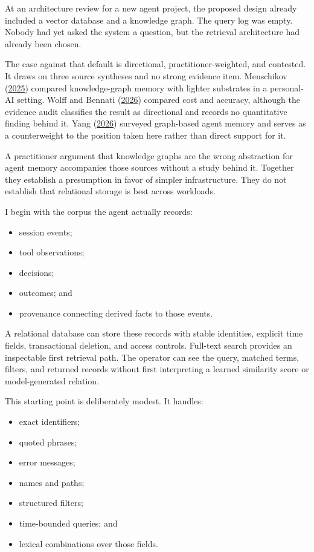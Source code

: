 At an architecture review for a new agent project, the proposed design already included a vector database and a knowledge graph. The query log was empty. Nobody had yet asked the system a question, but the retrieval architecture had already been chosen.

The case against that default is directional, practitioner-weighted, and contested. It draws on three source syntheses and no strong evidence item. Menschikov (\href{https://arxiv.org/abs/2506.17001}{2025}) compared knowledge-graph memory with lighter substrates in a personal-AI setting. Wolff and Bennati (\href{https://arxiv.org/abs/2601.07978}{2026}) compared cost and accuracy, although the evidence audit classifies the result as directional and records no quantitative finding behind it. Yang (\href{https://arxiv.org/abs/2602.05665}{2026}) surveyed graph-based agent memory and serves as a counterweight to the position taken here rather than direct support for it.

A practitioner argument that knowledge graphs are the wrong abstraction for agent memory accompanies those sources without a study behind it. Together they establish a presumption in favor of simpler infrastructure. They do not establish that relational storage is best across workloads.


I begin with the corpus the agent actually records:

\begin{itemize}
\tightlist
\item
  session events;
\item
  tool observations;
\item
  decisions;
\item
  outcomes; and
\item
  provenance connecting derived facts to those events.
\end{itemize}

A relational database can store these records with stable identities, explicit time fields, transactional deletion, and access controls. Full-text search provides an inspectable first retrieval path. The operator can see the query, matched terms, filters, and returned records without first interpreting a learned similarity score or model-generated relation.


This starting point is deliberately modest. It handles:

\begin{itemize}
\tightlist
\item
  exact identifiers;
\item
  quoted phrases;
\item
  error messages;
\item
  names and paths;
\item
  structured filters;
\item
  time-bounded queries; and
\item
  lexical combinations over those fields.
\end{itemize}


